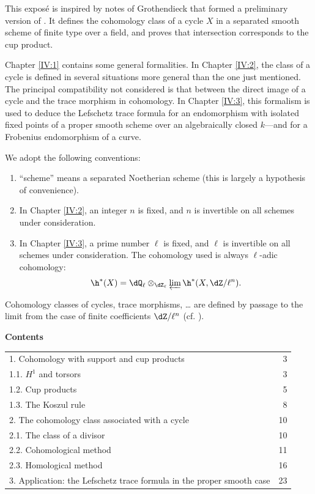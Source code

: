 This exposé is inspired by notes of Grothendieck that formed a preliminary
version of . It defines the cohomology class of a cycle $X$ in
a separated smooth scheme of finite type over a field, and proves that
intersection corresponds to the cup product.

Chapter \ref{IV:1} contains some general formalities. In Chapter \ref{IV:2},
the class of a cycle is defined in several situations more general than the
one just mentioned. The principal compatibility not considered is that
between the direct image of a cycle and the trace morphism in cohomology. In
Chapter \ref{IV:3}, this formalism is used to deduce the Lefschetz trace
formula for an endomorphism with isolated fixed points of a proper smooth
scheme over an algebraically closed $k$---and for a Frobenius endomorphism of
a curve.

We adopt the following conventions:
\begin{enumerate}[\indent 1)]
  \item ``scheme'' means a separated Noetherian scheme (this is largely a
    hypothesis of convenience).
  \item In Chapter \ref{IV:2}, an integer $n$ is fixed, and $n$ is invertible
    on all schemes under consideration.
  \item In Chapter \ref{IV:3}, a prime number $\ell$ is fixed, and $\ell$ is
    invertible on all schemes under consideration. The cohomology used is
    always $\ell$-adic cohomology:
    \[
      \h^*(X) = \dQ_\ell\otimes_{\dZ_\ell} \varprojlim \h^*(X,\dZ/\ell^n) \text{.}
    \]
\end{enumerate}
Cohomology classes of cycles, trace morphisms, \ldots{} are defined by passage
to the limit from the case of finite coefficients $\dZ/\ell^n$ (cf.
).




















\begin{center}\textbf{Contents}\end{center}
\begin{tabular}{p{}r}
1. Cohomology with support and cup products & 3\\
1.1. $H^1$ and torsors & 3\\
1.2. Cup products & 5\\
1.3. The Koszul rule & 8\\
2. The cohomology class associated with a cycle & 10\\
2.1. The class of a divisor & 10\\
2.2. Cohomological method & 11\\
2.3. Homological method & 16\\
3. Application: the Lefschetz trace formula in the proper smooth case & 23
\end{tabular}

